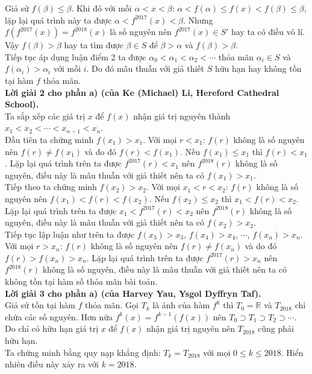 \begin{ex}
{Giả sử $f(\beta)\le\beta$. Khi đó với mỗi $\alpha < x < \beta$: $\alpha<f(\alpha)\le f(x)<f(\beta)\le\beta$, lặp lại quá trình này ta được $\alpha<f^{2017}(x)<\beta$. Nhưng $f(f^{2017}(x))=f^{2018}(x)$ là số nguyên nên $f^{2017}(x)\in S'$ hay ta có điều vô lí.\\
Vậy $f(\beta)>\beta$ hay ta tìm được $\beta\in S$ để $\beta>\alpha$ và $f(\beta)>\beta$.\\     
Tiếp tục áp dụng luận điểm 2 ta được $\alpha_0<\alpha_1<\alpha_2<\cdots$ thỏa mãn $\alpha_i\in S$ và $f(\alpha_i)>\alpha_i$ với mỗi $i$. Do đó mâu thuẫn với giả thiết $S$ hữu hạn hay không tồn tại hàm $f$ thỏa mãn.\\
\textbf{Lời giải 2 cho phần a) (của Ke (Michael) Li, Hereford Cathedral School).}\\
Ta sắp xếp các giá trị $x$ để $f(x)$ nhận giá trị nguyên thành $x_1<x_2<\cdots<x_{n-1}<x_n$.\\
Đầu tiên ta chứng minh $f(x_1)>x_1$. Với mọi $r<x_1$: $f(r)$ không là số nguyên nên $f(r)\ne f(x_1)$ và do đó $f(r)<f(x_1)$. Nếu $f(x_1)\le x_1$ thì $f(r)<x_1$. Lặp lại quá trình trên ta được $f^{2017}(r)<x_1$ nên $f^{2018}(r)$ không là số nguyên, điều này là mâu thuẫn với giả thiết nên ta có $f(x_1)>x_1$.\\
Tiếp theo ta chứng minh $f(x_2)>x_2$. Với mọi $x_1<r<x_2$: $f(r)$ không là số nguyên nên $f(x_1)<f(r)<f(x_2)$. Nếu $f(x_2)\le x_2$ thì $x_1<f(r)<x_2$. Lặp lại quá trình trên ta được $x_1<f^{2017}(r)<x_2$ nên $f^{2018}(r)$ không là số nguyên, điều này là mâu thuẫn với giả thiết nên ta có $f(x_2)>x_2$.\\
Tiếp tục lập luận như trên ta được $f(x_3)>x_3$, $f(x_4)>x_4$, $\cdots$, $f(x_n)>x_n$.\\
Với mọi $r>x_n$: $f(r)$ không là số nguyên nên $f(r)\ne f(x_n)$ và do đó $f(r)>f(x_n)>x_n$. Lặp lại quá trình trên ta được $f^{2017}(r)>x_n$ nên $f^{2018}(r)$ không là số nguyên, điều này là mâu thuẫn với giả thiết nên ta có không tồn tại hàm số thỏa mãn bài toán.\\
\textbf{Lời giải 3 cho phần a) (của Harvey Yau, Ysgol Dyffryn Taf).}\\
Giả sử tồn tại hàm $f$ thỏa mãn. Gọi $T_k$ là ảnh của hàm $f^k$ thì $T_0=\mathbb{R}$ và $T_{2018}$ chỉ chứa các số nguyên. Hơn nữa $f^k(x)=f^{k-1}(f(x))$ nên $T_0\supset T_1\supset T_2\supset\cdots$.\\
Do chỉ có hữu hạn giá trị $x$ để $f(x)$ nhận giá trị nguyên nên $T_{2018}$ cũng phải hữu hạn.\\
Ta chứng minh bằng quy nạp khẳng định: $T_k=T_{2018}$ với mọi $0\le k\le 2018$. Hiển nhiên điều này xảy ra với $k=2018$.\\
}
\end{ex}

